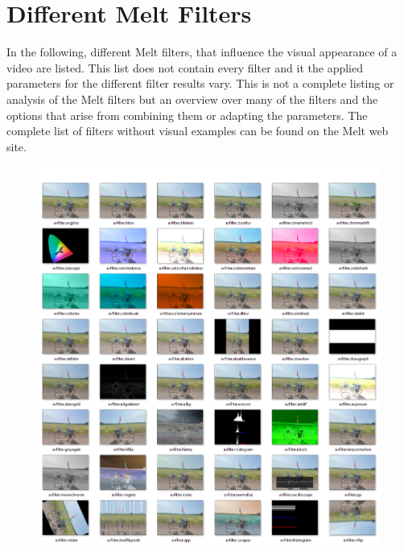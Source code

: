 \documentclass[../MasterThesis.tex]{subfiles}
\begin{document}

\newpage
\section{Different Melt Filters} \label{appendix:differentMeltFilter}

In the following, different Melt filters, that influence the visual appearance of a video are listed. This list does not contain every filter and it the applied parameters for the different filter results vary. This is not a complete listing or analysis of the Melt filters but an overview over many of the filters and the options that arise from combining them or adapting the parameters. The complete list of filters without visual examples can be found on the Melt web site.~\cite{melt_filters}
%
\begin{figure}[H]
	\includegraphics[width=1\textwidth]{Seite1.png}
\end{figure}
\end{document}
